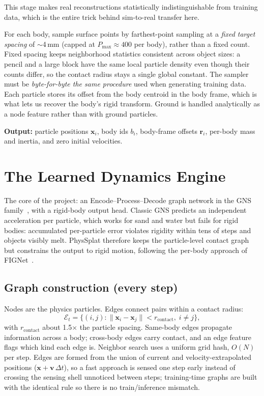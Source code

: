 \documentclass[11pt]{article}
\newcommand{\x}{\mathbf{x}}
\newcommand{\vv}{\mathbf{v}}
\begin{document}
This stage makes real reconstructions statistically indistinguishable from training data, which is the entire trick behind sim-to-real transfer here.

For each body, sample surface points by farthest-point sampling at a \emph{fixed target spacing} of $\sim$4\,mm (capped at $P_{\max} \approx 400$ per body), rather than a fixed count. Fixed spacing keeps neighborhood statistics consistent across object sizes: a pencil and a large block have the same local particle density even though their counts differ, so the contact radius stays a single global constant. The sampler must be \emph{byte-for-byte the same procedure} used when generating training data. Each particle stores its offset from the body centroid in the body frame, which is what lets us recover the body's rigid transform. Ground is handled analytically as a node feature rather than with ground particles.

\textbf{Output:} particle positions $\x_i$, body ids $b_i$, body-frame offsets $\mathbf{r}_i$, per-body mass and inertia, and zero initial velocities.

\section{The Learned Dynamics Engine}
\label{sec:dynamics}

The core of the project: an Encode--Process--Decode graph network in the GNS family~\cite{gns}, with a rigid-body output head. Classic GNS predicts an independent acceleration per particle, which works for sand and water but fails for rigid bodies: accumulated per-particle error violates rigidity within tens of steps and objects visibly melt. PhysSplat therefore keeps the particle-level contact graph but constrains the output to rigid motion, following the per-body approach of FIGNet~\cite{fignet}.

\subsection{Graph construction (every step)}
Nodes are the physics particles. Edges connect pairs within a contact radius:
\begin{equation}
\mathcal{E}_t = \{(i,j) : \lVert \x_i - \x_j \rVert < r_{\text{contact}},\; i \neq j\},
\end{equation}
with $r_{\text{contact}}$ about 1.5$\times$ the particle spacing. Same-body edges propagate information across a body; cross-body edges carry contact, and an edge feature flags which kind each edge is. Neighbor search uses a uniform grid hash, $O(N)$ per step. Edges are formed from the union of current and velocity-extrapolated positions ($\x + \vv\,\Delta t$), so a fast approach is sensed one step early instead of crossing the sensing shell unnoticed between steps; training-time graphs are built with the identical rule so there is no train/inference mismatch.
\end{document}
